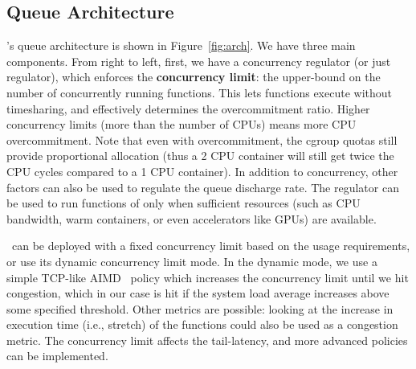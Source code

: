 \subsection{Queue Architecture}
\label{sec:q:arch}

\sysname's queue architecture is shown in Figure~\ref{fig:arch}.
We have three main components.
%
From right to left, first, we have a concurrency regulator (or just regulator), which enforces the \textbf{concurrency limit}: the  upper-bound on the number of concurrently running functions. 
%
This lets functions execute  without timesharing, and effectively determines the overcommitment ratio.
Higher concurrency limits (more than the number of CPUs) means  more CPU overcommitment.
Note that even with overcommitment, the cgroup quotas still provide proportional allocation (thus a 2 CPU container will still get twice the CPU cycles compared to a 1 CPU container). 
%
In addition to concurrency, other factors can also be used to regulate the queue discharge rate. 
The regulator can be used to run functions of only when sufficient resources (such as CPU bandwidth, warm containers, or even accelerators like GPUs) are available. 


\sysname~can be deployed with a fixed concurrency limit based on the usage requirements, or use its dynamic concurrency limit mode. 
In the dynamic mode, we use a simple TCP-like AIMD~\cite{yang2000general} policy which increases the concurrency limit until we hit congestion, which in our case is hit if the system load average increases above some specified threshold. 
Other metrics are possible: looking at the increase in execution time (i.e., stretch) of the functions could also be used as a congestion metric.
The concurrency limit affects the tail-latency, and more advanced policies can be implemented. 


\begin{comment}
Having the container map also allows us to implement \textbf{concurrent cold-start mitigation}.
If the function at the head of the queue has no warm containers available, and one of its instantiations is running, then we put the function back in the queue.
As a function's warm start is typically orders of magnitude shorter than cold starts, it is better for it to wait for warm container than to cold start one.
We implement this by asking the container pool for a warm container, and if it fails to give us one we can re-queue the invocation for the future.
Optionally, we can allow for a cold start to increase the number of warm containers for a function, naturally scaling if there is an increase in frequency.
\end{comment}

